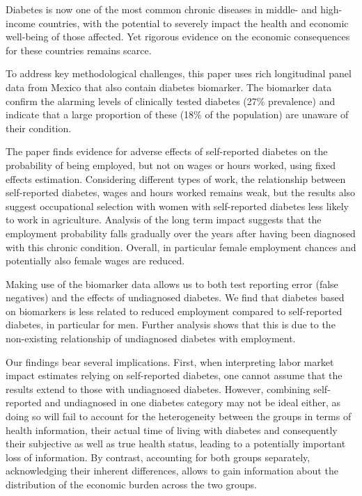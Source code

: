 \documentclass[12pt,english]{article}
\begin{document}
Diabetes is now one of the most common chronic diseases in middle- and high-income countries, with the potential to severely impact the health and economic well-being of those affected. Yet rigorous evidence on the economic consequences for these countries
remains scarce. 

To address key methodological challenges, this paper uses rich longitudinal panel data from Mexico that also contain diabetes biomarker. The biomarker data confirm the alarming levels of clinically tested diabetes (27\% prevalence) and indicate that a large proportion of these (18\% of the population) are unaware of their condition.

The paper finds evidence for adverse effects of self-reported diabetes on the probability of being employed, but not on wages or hours worked, using fixed effects estimation. Considering different types of work, the relationship between self-reported diabetes, wages
and hours worked remains weak, but the results also suggest occupational selection with women with self-reported diabetes less likely to work in agriculture. Analysis of the long term impact suggests that the employment probability falls gradually over the years
after having been diagnosed with this chronic condition. Overall, in particular female employment chances and potentially also female wages are reduced.

Making use of the biomarker data allows us to both test reporting error (false negatives) and the effects of undiagnosed diabetes. We find that diabetes based on biomarkers is less related to reduced employment compared to self-reported diabetes, in particular for men. Further analysis shows that this is due to the non-existing relationship of undiagnosed diabetes with employment.

Our findings bear several implications. First, when interpreting labor market impact estimates relying on self-reported diabetes, one cannot assume that the results extend to those with undiagnosed diabetes. However, combining self-reported and undiagnosed in one diabetes category may not be ideal either, as doing so will fail to account for the heterogeneity between the groups in terms of health information, their actual time of living with diabetes and consequently their subjective as well as true health status, leading to a potentially important loss of information. By contrast, accounting for both groups separately, acknowledging their inherent differences, allows to gain information about the distribution of the economic burden across the two groups.
\end{document}
